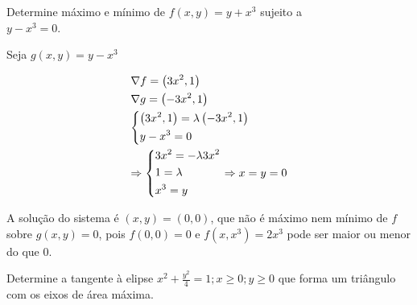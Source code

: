 \documentclass{book}
\begin{document}
\begin{ex}
    Determine m\'aximo e m\'inimo de $f\left( {x,y} \right) = y + x^3$ sujeito a \\ $y - x^3  = 0$.
\end{ex}

\begin{sol}
Seja $g\left( {x,y} \right) = y - x^3$

\[
\begin{gathered}
\nabla f = \left( {3x^2 ,1} \right) \hfill \\
\nabla g = \left( { - 3x^2 ,1} \right) \hfill \\
\left\{ \begin{gathered}
\left( {3x^2 ,1} \right) = \lambda \left( { - 3x^2 ,1} \right) \hfill \\
y - x^3  = 0 \hfill \\
\end{gathered}  \right. \hfill \\
\Rightarrow \left\{ \begin{gathered}
3x^2  =  - \lambda 3x^2  \hfill \\
1 = \lambda  \hfill \\
x^3  = y \hfill \\
\end{gathered}  \right. \Rightarrow x = y = 0 \hfill \\
\end{gathered}
\]

    A solu\c c\~ao do sistema \'e $\left( {x,y} \right) = \left( {0,0} \right)$, que n\~ao \'e m\'aximo nem m\'inimo de $f$ sobre $g\left( {x,y} \right) = 0$, pois $f\left( {0,0} \right) = 0$ e $f\left( {x,x^3 } \right) = 2x^3$ pode ser maior ou menor do que $0$.
\end{sol}

\begin{ex}
Determine a tangente \`a elipse $x^2  + \frac{{y^2 }}
{4} = 1;x \geqslant 0;y \geqslant 0$ que forma um tri\^angulo com os eixos de \'area m\'axima.
\end{ex}
\end{document}
